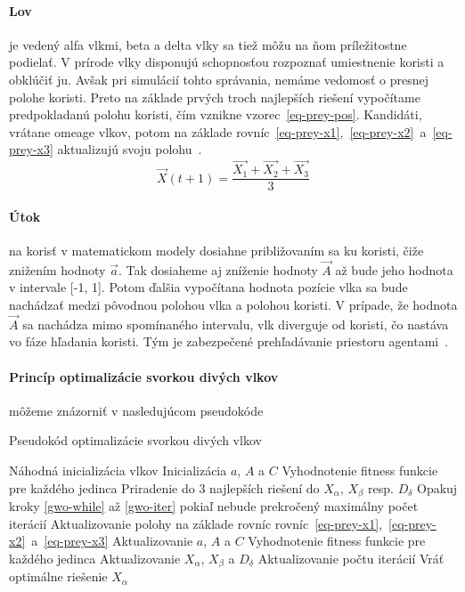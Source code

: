 \documentclass[a4paper,slovak,12pt,appendix]{article}
\begin{document}
\paragraph{Lov} je vedený alfa vlkmi, beta a delta vlky sa tiež môžu na ňom
príležitostne podielať. V prírode vlky disponujú schopnosťou rozpoznať
umiestnenie koristi a obklúčiť ju. Avšak pri simulácií tohto správania, nemáme
vedomosť o presnej polohe koristi. Preto na základe prvých troch najlepších
riešení vypočítame predpokladanú polohu koristi, čím vznikne
vzorec~\ref{eq-prey-pos}. Kandidáti, vrátane omeage vlkov, potom na základe
rovníc~\ref{eq-prey-x1},~\ref{eq-prey-x2}~a~\ref{eq-prey-x3} aktualizujú svoju
polohu~\cite{Seeley1991}.
\begin{equation}
  \vec{X}(t+1) = \frac{\vec{X_1} + \vec{X_2} + \vec{X_3}}{3}
  \label{eq-prey-pos}
\end{equation}

\paragraph{Útok} na korisť v matematickom modely dosiahne približovaním sa ku
koristi, čiže znižením hodnoty $\vec{a}$. Tak dosiaheme aj zníženie hodnoty
$\vec{A}$ až bude jeho hodnota v intervale [-1, 1]. Potom ďalšia vypočítana
hodnota pozície vlka sa bude nachádzať medzi pôvodnou polohou vlka
a polohou koristi. V prípade, že hodnota $\vec{A}$ sa nachádza mimo spomínaného
intervalu, vlk diverguje od koristi, čo nastáva vo fáze hľadania koristi. Tým
je zabezpečené prehľadávanie priestoru agentami~\cite{Seeley1991}.

\paragraph{Princíp optimalizácie svorkou divých vlkov} môžeme znázorniť
v nasledujúcom pseudokóde~\cite{Seeley1991}
\begin{algorithm}[H]
  \caption{Pseudokód optimalizácie svorkou divých vlkov}
  \begin{algorithmic}[1]
    \State Náhodná inicializácia vlkov
    \State Inicializácia $a$, $A$ a $C$
    \State Vyhodnotenie fitness funkcie pre každého jedinca
    \State Priradenie do 3 najlepších riešení do $X_\alpha$, $X_\beta$ resp. $D_\delta$
    \State Opakuj kroky \ref{gwo-while} až \ref{gwo-iter} pokiaľ nebude prekročený maximálny počet iterácií \label{gwo-while}
    \State Aktualizovanie polohy na základe rovníc rovníc~\ref{eq-prey-x1},~\ref{eq-prey-x2}~a~\ref{eq-prey-x3}
    \State Aktualizovanie $a$, $A$ a $C$
    \State Vyhodnotenie fitness funkcie pre každého jedinca
    \State Aktualizovanie $X_\alpha$, $X_\beta$ a $D_\delta$
    \State Aktualizovanie počtu iterácií \label{gwo-iter}
    \State Vráť optimálne riešenie $X_\alpha$
  \end{algorithmic}
\end{algorithm}
\end{document}
